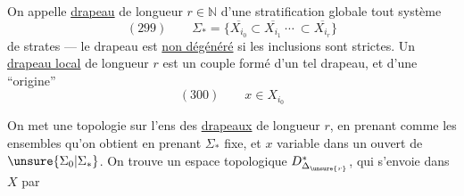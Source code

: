 
On appelle \uline{drapeau} de longueur $r\in\mathbb N$ d'une stratification globale tout système
\[
(299)\qquad \Sigma_*=\{\overline{X_{i_0}}\subset\overline{X_{i_1}}\ \cdots\ \subset\overline{X_{i_r}}\}
\]
de strates --- le drapeau est \uline{non dégénéré} si les inclusions sont strictes.
Un \uline{drapeau local}  de longueur $r$ est un  couple formé d'un tel drapeau, et d'une ``origine'' 
\[
(300)\qquad x\in X_{i_0}
\]

On met une topologie sur l'ens des \uline{drapeaux}  de  longueur $r$, en prenant comme   les ensembles qu'on obtient en prenant $\Sigma_*$ fixe, et $x$ variable dans un ouvert de $\unsure{\Sigma_0|\Sigma_*}$.
On trouve un espace topologique $D_{\Delta_{\unsure{r}}}^{*}$, qui s'envoie dans $X$ par

